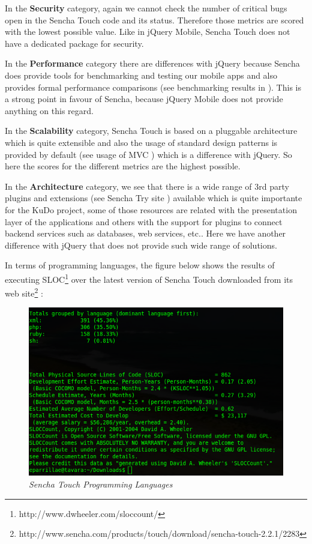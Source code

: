 \documentclass[a4paper,12pt]{book}
\begin{document}
In the \textbf{Security} category, again we cannot check the number of critical bugs open in the Sencha Touch code and its status. Therefore those metrics are scored with the lowest possible value. Like in jQuery Mobile, Sencha Touch does not have a dedicated package for security.

In the \textbf{Performance} category there are differences with jQuery because Sencha does provide tools for benchmarking and testing our mobile apps and also provides formal performance comparisons (see benchmarking results in \cite{sencha performance}). This is a strong point in favour of Sencha, because jQuery Mobile does not provide anything on this regard.

In the \textbf{Scalability} category, Sencha Touch is based on a pluggable architecture which is quite extensible and also the usage of standard design patterns is  provided by default (see usage of MVC \cite{sencha MVC}) which is a difference with jQuery. So here the scores for the different metrics are the highest possible.

In the \textbf{Architecture} category, we see that there is a wide range of 3rd party plugins and extensions (see Sencha Try site \cite{sencha Try}) available which is quite importante for the KuDo project, some of those resources are related with the presentation layer of the applications and others with the support for plugins to connect backend services such as databases, web services, etc.. Here we have another difference with jQuery that does not provide such wide range of solutions.

In terms of programming languages, the figure below shows the results of executing SLOC\footnote{http://www.dwheeler.com/sloccount/} over the latest version of Sencha Touch downloaded from its web site\footnote{http://www.sencha.com/products/touch/download/sencha-touch-2.2.1/2283} :

\begin{figure}[H]
    \centering
    \includegraphics[width=15cm, keepaspectratio]{img/senchasloccount.png}
    \caption{\textit{Sencha Touch Programming Languages}}
    \label{figure:jquerylanguages}
 \end{figure}
\end{document}

